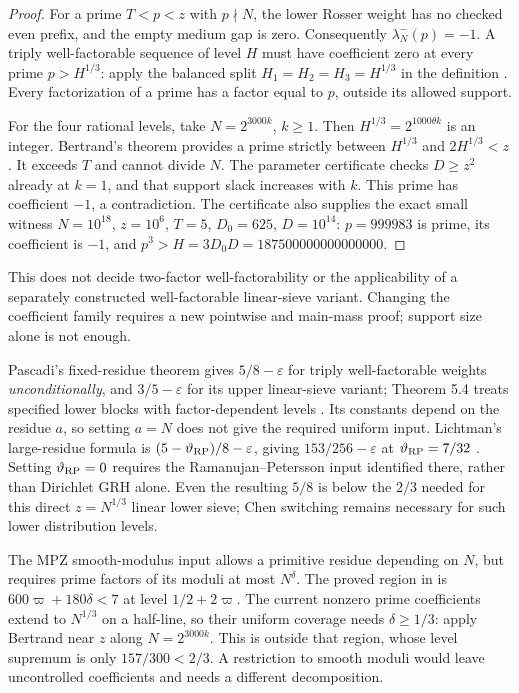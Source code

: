 \documentclass[11pt]{article}
\begin{document}
\begin{proof}
For a prime $T<p<z$ with $p\nmid N$, the lower Rosser weight has no
checked even prefix, and the empty medium gap is zero. Consequently
$\lambda_N^-(p)=-1$. A triply well-factorable sequence of level $H$
must have coefficient zero at every prime $p>H^{1/3}$: apply the
balanced split $H_1=H_2=H_3=H^{1/3}$ in the definition
\cite[Definition 1.1]{Pascadi}. Every factorization of a prime has a
factor equal to $p$, outside its allowed support.

For the four rational levels, take $N=2^{3000k}$, $k\ge1$.
Then $H^{1/3}=2^{1000\theta k}$ is an integer. Bertrand's theorem
provides a prime strictly between $H^{1/3}$ and $2H^{1/3}<z$.
It exceeds $T$ and cannot divide $N$. The parameter certificate
checks $D\ge z^2$ already at $k=1$, and that support slack increases
with $k$. This prime has coefficient $-1$, a contradiction.
The certificate also supplies the exact small witness
$N=10^{18}$, $z=10^6$, $T=5$, $D_0=625$, $D=10^{14}$:
$p=999983$ is prime, its coefficient is $-1$, and
$p^3>H=3D_0D=187500000000000000$.
\end{proof}
This does not decide two-factor well-factorability or the applicability
of a separately constructed well-factorable linear-sieve variant.
Changing the coefficient family requires a new pointwise and main-mass
proof; support size alone is not enough.

Pascadi's fixed-residue theorem gives $5/8-\varepsilon$ for triply
well-factorable weights \emph{unconditionally}, and $3/5-\varepsilon$
for its upper linear-sieve variant; Theorem 5.4 treats specified lower
blocks with factor-dependent levels \cite{Pascadi}. Its constants
depend on the residue $a$, so setting $a=N$ does not give the required
uniform input. Lichtman's large-residue formula is
$(5-\vartheta_{\rm RP})/8-\varepsilon$, giving $153/256-\varepsilon$
at $\vartheta_{\rm RP}=7/32$ \cite[Theorem 1.7]{Lichtman}.
Setting $\vartheta_{\rm RP}=0$ requires the Ramanujan--Petersson
input identified there, rather than Dirichlet GRH alone.
Even the resulting $5/8$ is below the $2/3$ needed for this direct
$z=N^{1/3}$ linear lower sieve; Chen switching remains necessary
for such lower distribution levels.

The MPZ smooth-modulus input allows a primitive residue depending
on $N$, but requires prime factors of its moduli at most $N^\delta$.
The proved region in \cite[Claim 2.4, Theorem 2.5]{Polymath} is
$600\varpi+180\delta<7$ at level $1/2+2\varpi$.
The current nonzero prime coefficients extend to $N^{1/3}$ on a
half-line, so their uniform coverage needs $\delta\ge1/3$:
apply Bertrand near $z$ along $N=2^{3000k}$.
This is outside that region, whose level supremum is only
$157/300<2/3$. A restriction to smooth moduli would leave
uncontrolled coefficients and needs a different decomposition.
\end{document}
